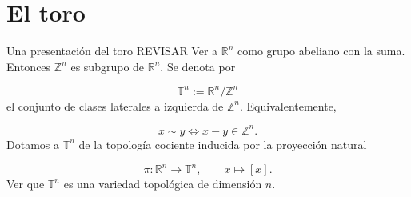 \section{El toro}
\begin{bookexercise}{Una presentación del toro REVISAR}
Ver a $\mathbb{R}^n$ como grupo abeliano con la suma. Entonces $\mathbb{Z}^n$ es subgrupo de $\mathbb{R}^n$. Se denota por

\[
\mathbb{T}^n:=\mathbb{R}^n/\mathbb{Z}^n
\]
el conjunto de clases laterales a izquierda de $\mathbb{Z}^n$. Equivalentemente,

\[
x\sim y \iff x-y\in \mathbb{Z}^n.
\]
Dotamos a $\mathbb{T}^n$ de la topología cociente inducida por la proyección natural

\[
\pi:\mathbb{R}^n\longrightarrow \mathbb{T}^n,\qquad x\longmapsto [x].
\]
Ver que $\mathbb{T}^n$ es una variedad topológica de dimensión $n$.

\end{bookexercise}
